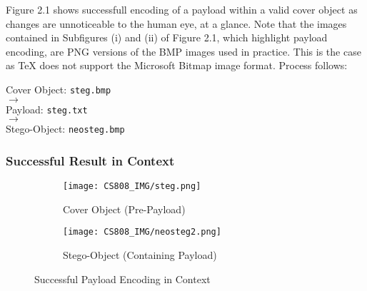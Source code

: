 \documentclass[11pt, english]{article}
\begin{document}
	Figure 2.1 shows successfull encoding of a payload within a valid cover object as changes are unnoticeable to the human eye, at a glance. Note that the images contained in Subfigures (i) and (ii) of Figure 2.1, which highlight payload encoding, are PNG versions of the BMP images used in practice. This is the case as {\TeX} does not support the Microsoft Bitmap image format. Process follows:\\

	\begin{center}
		Cover Object: \verb|steg.bmp|\\ $\longrightarrow$\\ Payload: \verb|steg.txt|\\ $\longrightarrow$\\ Stego-Object: \verb|neosteg.bmp|
	\end{center}

		\subsubsection{Successful Result in Context}

	\begin{figure}[H]
        \begin{center}
                \begin{subfigure}[t]{6cm}
                \begin{center}
                        \texttt{[image: CS808\_IMG/steg.png]}
                \end{center}
                        \caption{Cover Object (Pre-Payload)}
                \end{subfigure}
                \begin{subfigure}[t]{6cm}
                \begin{center}
                        \texttt{[image: CS808\_IMG/neosteg2.png]}
                \end{center}
                        \caption{Stego-Object (Containing Payload)}
                \end{subfigure}
        \end{center}
                \caption{Successful Payload Encoding in Context}
        \end{figure}
\end{document}
